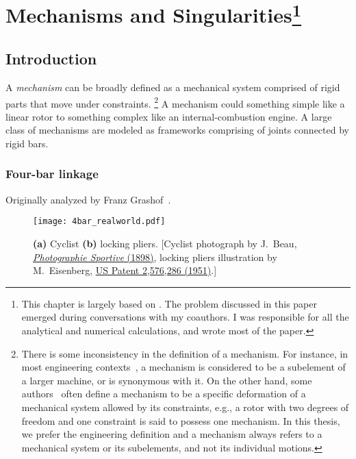 
\chapter[Mechanisms and Singularities]{Mechanisms and Singularities\footnote{%
  This chapter is largely based on .
  The problem discussed in this paper emerged during conversations with my coauthors.
  I was responsible for all the analytical and numerical calculations, and wrote most of the paper.
}}


\section{Introduction}

A \emph{mechanism} can be broadly defined as a mechanical system comprised of rigid parts that move under constraints.%
\footnote{There is some inconsistency in the definition of a mechanism.
  For instance, in most engineering contexts~\cite{hartenberg1964,hunt1978,myszka2012}, a mechanism is considered to be a subelement of a larger machine, or is synonymous with it.
  On the other hand, some authors~\cite{connelly2015} often define a mechanism to be a specific deformation of a mechanical system allowed by its constraints, e.g., a rotor with two degrees of freedom and one constraint is said to possess one mechanism.
  In this thesis, we prefer the engineering definition and a mechanism always refers to a mechanical system or its subelements, and not its individual motions.}
A mechanism could something simple like a linear rotor to something complex like an internal-combustion engine.
A large class of mechanisms are modeled as frameworks comprising of joints connected by rigid bars.

\subsection{Four-bar linkage}

Originally analyzed by Franz Grashof~\cite[pp.~113--118]{grashof1883}.
%
\begin{figure}
  \begin{center}
    \texttt{[image: 4bar\_realworld.pdf]}
  \end{center}
\caption{\textbf{(a)} Cyclist \textbf{(b)} locking pliers.
  {\footnotesize [Cyclist photograph by J.~Beau, \href{https://gallica.bnf.fr/ark:/12148/btv1b8433328}{\emph{Photographie Sportive} (1898)}, locking pliers illustration by M.~Eisenberg, \href{https://patents.google.com/patent/US2576286A}{US Patent 2,576,286 (1951)}.]}
}
  \label{fig:4bar_realworld}
\end{figure}

